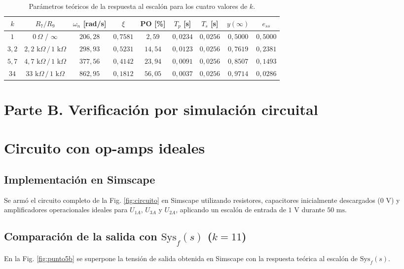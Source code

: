 \documentclass[11pt,a4paper]{article}
\begin{document}
\begin{table}[H]
    \centering
    \begin{tabular}{c c c c c c c c c}
        \toprule
        \textbf{$k$} & \textbf{$R_7 / R_9$} & \textbf{$\omega_n$ [rad/s]} & \textbf{$\xi$} & \textbf{PO [\%]} & \textbf{$T_p$ [s]} & \textbf{$T_s$ [s]} & \textbf{$y(\infty)$} & \textbf{$e_{ss}$} \\
        \midrule
        $1$ & $0\,\Omega$ / $\infty$ & $206,28$ & $0,7581$ & $2,59$ & $0,0234$ & $0,0256$ & $0,5000$ & $0,5000$ \\
        $3,2$ & $2,2\text{ k}\Omega\,/\,1\text{ k}\Omega$ & $298,93$ & $0,5231$ & $14,54$ & $0,0123$ & $0,0256$ & $0,7619$ & $0,2381$ \\
        $5,7$ & $4,7\text{ k}\Omega\,/\,1\text{ k}\Omega$ & $377,56$ & $0,4142$ & $23,94$ & $0,0091$ & $0,0256$ & $0,8507$ & $0,1493$ \\
        $34$ & $33\text{ k}\Omega\,/\,1\text{ k}\Omega$ & $862,95$ & $0,1812$ & $56,05$ & $0,0037$ & $0,0256$ & $0,9714$ & $0,0286$ \\
        \bottomrule
    \end{tabular}
    \caption{Parámetros teóricos de la respuesta al escalón para los cuatro valores de $k$.}
    \label{tab:punto4}
\end{table}

\section*{Parte B. Verificación por simulación circuital}

\section{Circuito con op-amps ideales}

\subsection{Implementación en Simscape}
Se armó el circuito completo de la Fig. \ref{fig:circuito} en Simscape utilizando resistores, capacitores inicialmente descargados ($0\text{ V}$) y amplificadores operacionales ideales para $U_{1A}$, $U_{3A}$ y $U_{2A}$, aplicando un escalón de entrada de $1\text{ V}$ durante $50\text{ ms}$.

\subsection{Comparación de la salida con $\text{Sys}_f(s)$ ($k = 11$)}
En la Fig. \ref{fig:punto5b} se superpone la tensión de salida obtenida en Simscape con la respuesta teórica al escalón de $\text{Sys}_f(s)$.
\end{document}
